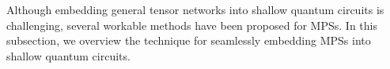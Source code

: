 \documentclass[12pt,dvipdfmx,twoside,openright]{report}
\begin{document}
 
Although embedding general tensor networks into shallow quantum circuits is challenging, several workable methods have been proposed for MPSs.
In this subsection, we overview the technique for seamlessly embedding MPSs into shallow quantum circuits.
\end{document}
